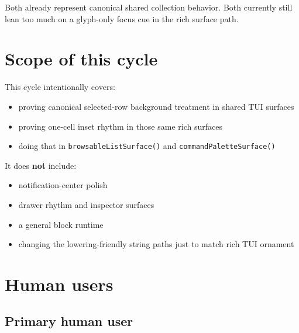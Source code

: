 Both already represent canonical shared collection behavior. Both currently still lean too much on a glyph-only focus cue in the rich surface path.

\section{Scope of this cycle}\label{record-170-scope-of-this-cycle}

This cycle intentionally covers:

\begin{itemize}
\tightlist
\item
  proving canonical selected-row background treatment in shared TUI surfaces
\item
  proving one-cell inset rhythm in those same rich surfaces
\item
  doing that in \texttt{b\allowbreak{}r\allowbreak{}o\allowbreak{}w\allowbreak{}s\allowbreak{}a\allowbreak{}b\allowbreak{}l\allowbreak{}e\allowbreak{}L\allowbreak{}i\allowbreak{}s\allowbreak{}t\allowbreak{}S\allowbreak{}u\allowbreak{}r\allowbreak{}f\allowbreak{}a\allowbreak{}c\allowbreak{}e\allowbreak{}(\allowbreak{})} and \texttt{c\allowbreak{}o\allowbreak{}m\allowbreak{}m\allowbreak{}a\allowbreak{}n\allowbreak{}d\allowbreak{}P\allowbreak{}a\allowbreak{}l\allowbreak{}e\allowbreak{}t\allowbreak{}t\allowbreak{}e\allowbreak{}S\allowbreak{}u\allowbreak{}r\allowbreak{}f\allowbreak{}a\allowbreak{}c\allowbreak{}e\allowbreak{}(\allowbreak{})}
\end{itemize}

It does \textbf{not} include:

\begin{itemize}
\tightlist
\item
  notification-center polish
\item
  drawer rhythm and inspector surfaces
\item
  a general block runtime
\item
  changing the lowering-friendly string paths just to match rich TUI ornament
\end{itemize}

\section{Human users}\label{record-170-human-users}

\subsection{Primary human user}\label{record-170-primary-human-user}

